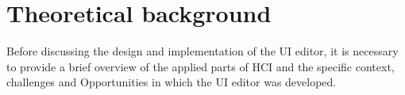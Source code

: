 
%
\chapter{Theoretical background}
\label{chap:background}

Before discussing the design and implementation of the UI editor, it is necessary to provide a brief overview of the applied parts of HCI and the specific context, challenges and Opportunities in which the UI editor was developed.
% 

